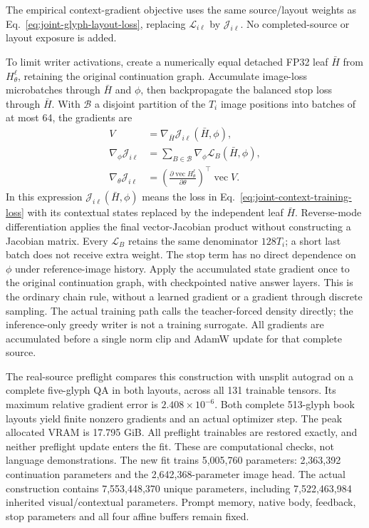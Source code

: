 \documentclass[12pt,a4paper]{article}
\providecommand{\DIFadd}[1]{{\protect\color{blue} \sf #1}} %
\begin{document}
\DIFadd{The empirical context-gradient objective uses the same source/layout weights
as Eq.~\ref{eq:joint-glyph-layout-loss}, replacing $\mathcal L_{i\ell}$ by
$\mathcal J_{i\ell}$. No completed-source or layout exposure is added.
}

\DIFadd{To limit writer activations, create a numerically equal detached FP32 leaf
$\bar H$ from $H_\theta^\ell$, retaining the original continuation graph.
Accumulate image-loss microbatches through $\bar H$ and $\phi$, then backpropagate
the balanced stop loss through $\bar H$. With $\mathcal B$ a disjoint partition
of the $T_i$ image positions into batches of at most 64, the gradients are
}\begin{equation}
 \begin{aligned}
 V&=\nabla_{\bar H}\mathcal J_{i\ell}(\bar H,\phi),\\
 \nabla_\phi\mathcal J_{i\ell}
   &=\sum_{B\in\mathcal B}\nabla_\phi\mathcal L_B(\bar H,\phi),\\
 \nabla_\theta\mathcal J_{i\ell}
   &=\left(\frac{\partial\operatorname{vec}H_\theta^\ell}{\partial\theta}\right)^{\!\top}
       \operatorname{vec}V.
 \end{aligned}
 \label{eq:joint-context-state-vjp}
\end{equation}
\DIFadd{In this expression $\mathcal J_{i\ell}(\bar H,\phi)$ means the loss in
Eq.~\ref{eq:joint-context-training-loss} with its contextual states replaced by
the independent leaf $\bar H$. Reverse-mode differentiation applies the final
vector-Jacobian product without constructing a Jacobian matrix.
Every $\mathcal L_B$ retains the same denominator $128T_i$; a short last batch
does not receive extra weight. The stop term has no direct dependence on
$\phi$ under reference-image history. Apply the accumulated state gradient
once to the original continuation graph, with checkpointed native answer
layers. This is the ordinary chain rule, without a learned gradient or a
gradient through discrete sampling. The actual training path calls the
teacher-forced density directly; the inference-only greedy writer is not a
training surrogate. All gradients are accumulated before a single norm clip
and AdamW update for that complete source.
}

\DIFadd{The real-source preflight compares this construction with unsplit autograd on
a complete five-glyph QA in both layouts, across all 131 trainable tensors. Its
maximum relative gradient error is $2.408\times10^{-6}$. Both complete 513-glyph
book layouts yield finite nonzero gradients and an actual optimizer step.
The peak allocated VRAM is 17.795 GiB. All preflight trainables are restored
exactly, and neither preflight update enters the fit. These are computational
checks, not language demonstrations. The new fit trains 5,005,760 parameters:
2,363,392 continuation parameters and the 2,642,368-parameter image head.
The actual construction contains 7,553,448,370 unique parameters, including
7,522,463,984 inherited visual/contextual parameters. Prompt memory, native body,
feedback, stop parameters and all four affine buffers remain fixed.
}
\end{document}

